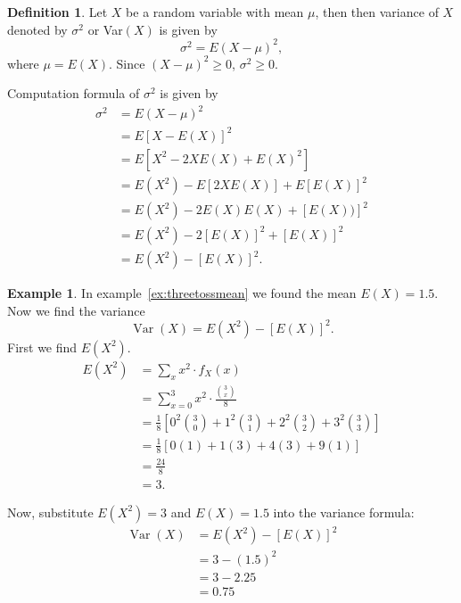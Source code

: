 \documentclass[12pt,a4paper]{report}
\theoremstyle{definition}
\newtheorem{definition}[thm]{Definition}
\newtheorem{example}[thm]{Example}
\theoremstyle{plain}
\theoremstyle{definition}
\begin{document}
\begin{definition}
Let $X$ be a random variable with mean $\mu$, then then variance of $X$ denoted by $\sigma^2$ or Var$(X)$ is given by \[\sigma^2=E(X-\mu)^2,\] where  $\mu=E(X)$. Since $(X - \mu)^2\geq 0$, $\sigma^2\geq 0$.
\end{definition}



Computation formula of $\sigma^2$ is given by 
\begin{align*}
\sigma^2 &=E(X-\mu)^2\\
& =E[X-E(X)]^2\\
&=E[X^2-2XE(X)+E(X)^2]\\
&=E(X^2)-E[2XE(X)]+E[E(X)]^2\\
&=E(X^2)-2E(X)E(X)+[E(X))]^2\\
&=E(X^2)-2[E(X)]^2+[E(X)]^2\\
&=E(X^2)-[E(X)]^2.
\end{align*}



\begin{example}
In example~\ref{ex:threetossmean} we found the mean $E(X) = 1.5$. Now we find the variance \[\operatorname{Var}(X) = E(X^2) - [E(X)]^2.\] First we find $E(X^2)$.
\[\begin{aligned}
E(X^2) & = \sum_x x^2\cdot f_X(x)\\
 &= \sum_{x=0}^{3} x^2 \cdot \frac{\binom{3}{x}}{8} \\
&= \frac{1}{8} \left[ 0^2\binom{3}{0} + 1^2\binom{3}{1} + 2^2\binom{3}{2} + 3^2\binom{3}{3} \right] \\
&= \frac{1}{8} \left[ 0(1) + 1(3) + 4(3) + 9(1) \right] \\
&= \frac{24}{8}\\
& = 3.
\end{aligned}\]

Now, substitute $E(X^2) = 3$ and $E(X) = 1.5$  into the variance formula:
\[\begin{aligned}
\operatorname{Var}(X) &= E(X^2) - [E(X)]^2 \\
&= 3 - (1.5)^2 \\
&= 3 - 2.25 \\
&= 0.75
\end{aligned}\]
\end{example}
\end{document}
